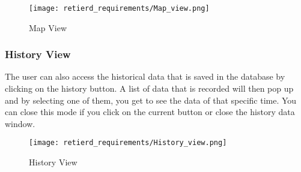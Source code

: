 \documentclass[../document]{subfiles}
\begin{document}
\begin{figure}[H]
	\centering
	\texttt{[image: retierd\_requirements/Map\_view.png]}
	\caption{Map View}
\end{figure}

\subsubsection{History View}
The user can also access the historical data that is saved in the database by clicking on the history button. A list of data that is recorded will then pop up and by selecting one of them, you get to see the data of that specific time. You can close this mode if you click on the current button or close the history data window.

\begin{figure}[H]
	\centering
	\texttt{[image: retierd\_requirements/History\_view.png]}
	\caption{History View}
\end{figure}
\end{document}
